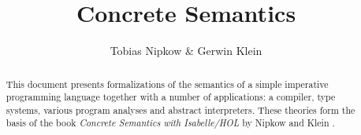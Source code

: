 \documentclass[11pt,a4paper]{article}
\begin{document}
\title{Concrete Semantics}
\author{Tobias Nipkow \& Gerwin Klein}
\maketitle

\begin{abstract}
This document presents formalizations of the semantics of a simple imperative programming language together with a number of applications: a compiler, type systems, various program analyses and abstract interpreters. These theories form the basis of the book \emph{Concrete Semantics with Isabelle/HOL} by Nipkow and Klein \cite{NipkowK2014}.
\end{abstract}

\setcounter{tocdepth}{2}
\tableofcontents
\newpage



\nocite{Nipkow}
\nocite{ConcreteSemantics}



\end{document}
